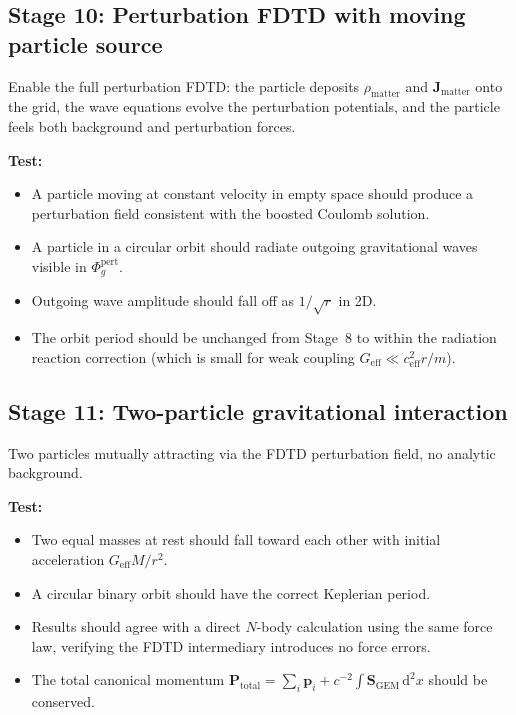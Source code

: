 \documentclass[11pt,a4paper]{article}
\newcommand{\vv}[1]{\mathbf{#1}}
\newcommand{\Phig}{\Phi_g}
\newcommand{\dd}{\mathrm{d}}
\begin{document}
\subsection{Stage 10: Perturbation FDTD with moving particle source}

Enable the full perturbation FDTD: the particle deposits $\rho_{\mathrm{matter}}$ and $\vv{J}_{\mathrm{matter}}$ onto the grid, the wave equations evolve the perturbation potentials, and the particle feels both background and perturbation forces.

\textbf{Test:}
\begin{itemize}
  \item A particle moving at constant velocity in empty space should produce a perturbation field consistent with the boosted Coulomb solution.
  \item A particle in a circular orbit should radiate outgoing gravitational waves visible in $\Phig^{\mathrm{pert}}$.
  \item Outgoing wave amplitude should fall off as $1/\sqrt{r}$ in 2D.
  \item The orbit period should be unchanged from Stage~8 to within the radiation reaction correction (which is small for weak coupling $G_{\mathrm{eff}} \ll c_{\mathrm{eff}}^2 r / m$).
\end{itemize}

\subsection{Stage 11: Two-particle gravitational interaction}

Two particles mutually attracting via the FDTD perturbation field, no analytic background.

\textbf{Test:}
\begin{itemize}
  \item Two equal masses at rest should fall toward each other with initial acceleration $G_{\mathrm{eff}}M/r^2$.
  \item A circular binary orbit should have the correct Keplerian period.
  \item Results should agree with a direct $N$-body calculation using the same force law, verifying the FDTD intermediary introduces no force errors.
  \item The total canonical momentum $\vv{P}_{\mathrm{total}} = \sum_i\vv{p}_i + c^{-2}\int\vv{S}_{\mathrm{GEM}}\,\dd^2x$ should be conserved.
\end{itemize}
\end{document}
